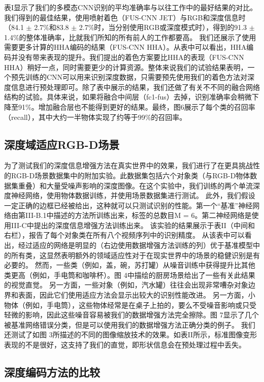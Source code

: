 表I显示了我们的多模态CNN识别的平均准确率与以往工作中的最好结果的对比。
我们得到的最佳结果，使用喷射着色（FUS-CNN JET）与RGB和深度信息时（84.1 $\pm$ 2.7\%和83.8 $\pm$ 2.7\%时，当分别使用RGB或深度模式时），得到的91.3 $\pm$ 1.4\%的整体准确率，比就我们所知的所有前人的工作都要高。
我们还展示了使用需要更多计算的HHA编码的结果（FUS-CNN HHA）。从表中可以看出，HHA编码并没有带来表现的提升。我们提出的着色方案要比HHA的表现（FUS-CNN HHA）稍好一点，同时需要更少的计算资源。整体来说我们的试验结果表明，一个预先训练的CNN可以用来识别深度数据，只需要预先使用我们的着色方法对深度信息进行预处理即可。除了表中展示的结果，我们还做了有关不不同的融合网络结构的试验。具体来说，如果将融合中间层（fc1-fus）去掉，识别准确率会稍微下降至91\%。增加融合层也不能得到更好的结果。最终，图6展示了每个类的召回率（recall），其中大约一半物体实现了约等于99\%的召回率。

\subsection{深度域适应RGB-D场景}

为了测试我们的深度信息增强方法在真实世界中的效果，我们进行了在更具挑战性的RGB-D场景数据集中的附加实验。此数据集包括六个对象类（与RGB-D物体数据集重叠）和大量受噪声影响的深度图像。在这个实验中，我们训练的两个单流深度神经网络，使用物体数据训练，并使用场景数据集进行测试。
此外，我们假设一定正确的边框已经被给出，这种就可以只测试识别的性能。第一个“基准”神经网络由第III-B.1中描述的方法所训练出来，标签的总数目M = 6。第二神经网络是使用III-C中提出的深度信息增强方法训练出来。
该实验的结果展示于表II（中间和右栏），报告了每个对象类在所有八个视频序列中的识别精度。
从该表中可以看出，经过适应的网络是明显的（右边使用数据增强方法训练的列）优于基准模型中的所有类，这显然表明额外的领域适应性对于在现实世界中的场景的稳健识别是有必要的。
然而，一些类（例如，盖，碗，苏打罐）从噪音训练中获得提升比其他类更高（例如，手电筒和咖啡杯）。图 4中描绘的厨房场景给出了一些有关此结果的视觉直觉。
另一方面，一些对象（例如，汽水罐）往往会出现非常嘈杂对象边界和表面，因此它们使用适应方法会显示出较大的识别性能改进。
另一方面，小物体（例如，手电筒），这些物体经常是在桌子上拍的，要么不受噪音影响或只受轻微的影响，因此这些噪音容易被我们的数据增强方法完全擦除。图 7显示了几个被基准网络错误分类，但是可以使用我们的数据增强方法正确分类的例子。
我们还测试了如图 3所描述的不同的图像缩放技术的效果。如表II所示，标准图像变形表现的不是很好，这支持了我们的直觉，即形状信息会在预处理过程中丢失。

\subsection{深度编码方法的比较}

